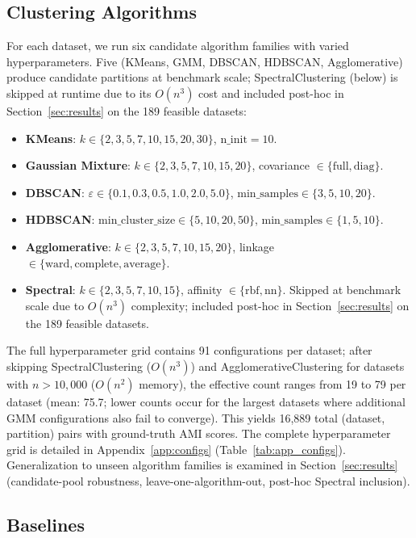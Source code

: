 \documentclass[10pt]{article} %
\begin{document}
\subsection{Clustering Algorithms}

For each dataset, we run six candidate algorithm families with varied hyperparameters. Five (KMeans, GMM, DBSCAN, HDBSCAN, Agglomerative) produce candidate partitions at benchmark scale; SpectralClustering (below) is skipped at runtime due to its $O(n^3)$ cost and included post-hoc in Section~\ref{sec:results} on the 189 feasible datasets:
\begin{itemize}
    \item \textbf{KMeans}: $k \in \{2,3,5,7,10,15,20,30\}$, $\text{n\_init} = 10$.
    \item \textbf{Gaussian Mixture}: $k \in \{2,3,5,7,10,15,20\}$, covariance $\in \{\text{full}, \text{diag}\}$.
    \item \textbf{DBSCAN}: $\varepsilon \in \{0.1, 0.3, 0.5, 1.0, 2.0, 5.0\}$, $\text{min\_samples} \in \{3, 5, 10, 20\}$.
    \item \textbf{HDBSCAN}: $\text{min\_cluster\_size} \in \{5,10,20,50\}$, $\text{min\_samples} \in \{1, 5, 10\}$.
    \item \textbf{Agglomerative}: $k \in \{2,3,5,7,10,15,20\}$, linkage $\in \{\text{ward}, \text{complete}, \text{average}\}$.
    \item \textbf{Spectral}: $k \in \{2,3,5,7,10,15\}$, affinity $\in \{\text{rbf}, \text{nn}\}$. Skipped at benchmark scale due to $O(n^3)$ complexity; included post-hoc in Section~\ref{sec:results} on the 189 feasible datasets.
\end{itemize}

The full hyperparameter grid contains 91 configurations per dataset; after skipping SpectralClustering ($O(n^3)$) and AgglomerativeClustering for datasets with $n > 10{,}000$ ($O(n^2)$ memory), the effective count ranges from 19 to 79 per dataset (mean: 75.7; lower counts occur for the largest datasets where additional GMM configurations also fail to converge). This yields 16,889 total (dataset, partition) pairs with ground-truth AMI scores. The complete hyperparameter grid is detailed in Appendix~\ref{app:configs} (Table~\ref{tab:app_configs}). Generalization to unseen algorithm families is examined in Section~\ref{sec:results} (candidate-pool robustness, leave-one-algorithm-out, post-hoc Spectral inclusion).

\subsection{Baselines}
\end{document}
